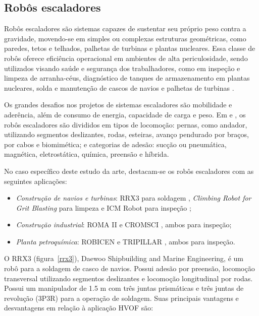\subsection{Robôs escaladores}\label{sota_climbers}
Robôs escaladores são sistemas capazes de sustentar seu próprio peso contra a
gravidade, movendo-se em simples ou complexas estruturas geométricas, como
paredes, tetos e telhados, palhetas de turbinas e plantas nucleares.
Essa classe de robôs oferece eficiência operacional em ambientes
de alta periculosidade, sendo utilizados visando saúde e segurança dos
trabalhadores, como em inspeção e limpeza de arranha-céus, diagnóstico de
tanques de armazenamento em plantas nucleares, solda e manutenção de cascos de
navios e palhetas de turbinas \cite{clawar}.

Os grandes desafios nos projetos de sistemas escaladores são mobilidade e
aderência, além de consumo de energia, capacidade de carga e peso. Em
\cite{modular}e \cite{climbsurv}, os robôs escaladores são divididos em tipos de locomoção:
pernas, como andador, utilizando segmentos deslizantes, rodas, esteiras, avanço
pendurado por braços, por cabos e biomimética; e categorias de adesão: sucção ou
pneumática, magnética, eletrostática, química, preensão e híbrida.

No caso específico deste estudo da arte, destacam-se os robôs escaladores com as
seguintes aplicações:

\begin{itemize}
  \item \emph{Construção de navios e turbinas}: RRX3 para soldagem
  \citep{rrx3}, \emph{Climbing Robot for Grit Blasting} para limpeza
  \citep{crgb} e ICM Robot para inspeção \citep{icm};
  \item \emph{Construção industrial}: ROMA II \citep{roma} e
  CROMSCI \citep{CROMSCI}, ambos para inspeção; 
 \item \emph{Planta petroquímica}: ROBICEN \citep{robicen} e
  TRIPILLAR \citep{tripillar}, ambos para inspeção.  
\end{itemize}

O RRX3 (figura~\ref{rrx3}), Daewoo Shipbuilding and Marine Engineering, é um
robô para a soldagem de casco de navios. Possui adesão por preensão, locomoção transversal utilizando segmentos deslizantes e locomoção
longitudinal por rodas. Possui um manipulador de 1.5 m com três juntas
prismáticas e três juntas de revolução (3P3R) para a operação de soldagem. Suas
principais vantagens e desvantagens em relação à aplicação HVOF são:

